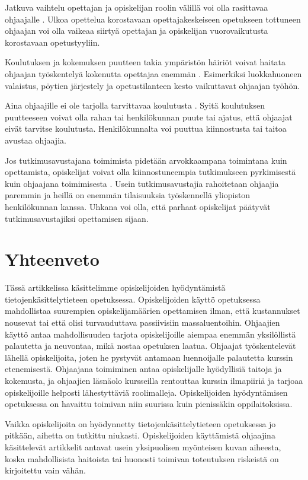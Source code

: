 \documentclass[finnish]{tktltiki2}
\theoremstyle{definition}
\theoremstyle{remark}
\begin{document}
Jatkuva vaihtelu opettajan ja opiskelijan roolin välillä voi olla rasittavaa ohjaajalle \cite{Mark11}. Ulkoa opettelua korostavaan opettajakeskeiseen opetukseen tottuneen ohjaajan voi olla vaikeaa siirtyä opettajan ja opiskelijan vuorovaikutusta korostavaan opetustyyliin. \par

Koulutuksen ja kokemuksen puutteen takia ympäristön häiriöt voivat haitata ohjaajan työskentelyä kokenutta opettajaa enemmän \cite{Patitsas12_3}. Esimerkiksi luokkahuoneen valaistus, pöytien järjestely ja opetustilanteen kesto vaikuttavat ohjaajan työhön. \par

Aina ohjaajille ei ole tarjolla tarvittavaa koulutusta \cite{Shannon98}. Syitä koulutuksen puutteeseen voivat olla rahan tai henkilökunnan puute tai ajatus, että ohjaajat eivät tarvitse koulutusta. Henkilökunnalta voi puuttua kiinnostusta tai taitoa avustaa ohjaajia. \par

Jos tutkimusavustajana toimimista pidetään arvokkaampana toimintana kuin opettamista, opiskelijat voivat olla kiinnostuneempia tutkimukseen pyrkimisestä kuin ohjaajana toimimisesta \cite{Shannon98}. Usein tutkimusavustajia rahoitetaan ohjaajia paremmin ja heillä on enemmän tilaisuuksia työskennellä yliopiston henkilökunnan kanssa. Uhkana voi olla, että parhaat opiskelijat päätyvät tutkimusavustajiksi opettamisen sijaan. \par


\section{Yhteenveto}
Tässä artikkelissa käsittelimme opiskelijoiden hyödyntämistä tie\-to\-jen\-kä\-sit\-te\-ly\-tie\-teen opetuksessa. Opiskelijoiden käyttö opetuksessa mahdollistaa suurempien opiskelijamäärien opettamisen ilman, että kustannukset nousevat tai että olisi turvauduttava passiivisiin massaluentoihin. Ohjaajien käyttö antaa mahdollisuuden tarjota opiskelijoille aiempaa enemmän yksilöllistä palautetta ja neuvontaa, mikä nostaa opetuksen laatua. Ohjaajat työskentelevät lähellä opiskelijoita, joten he pystyvät antamaan luennoijalle palautetta kurssin etenemisestä. Ohjaajana toimiminen antaa opiskelijalle hyödyllisiä taitoja ja kokemusta, ja ohjaajien läsnäolo kursseilla rentouttaa kurssin ilmapiiriä ja tarjoaa opiskelijoille helposti lähestyttäviä roolimalleja. Opiskelijoiden hyödyntämisen opetuksessa on havaittu toimivan niin suurissa \cite{Reges03} kuin pienissäkin \cite{Dickson11} oppilaitoksissa. \par

Vaikka opiskelijoita on hyödynnetty tietojenkäsittelytieteen opetuksessa jo pitkään, aihetta on tutkittu niukasti. Opiskelijoiden käyttämistä ohjaajina käsittelevät artikkelit antavat usein yksipuolisen myönteisen kuvan aiheesta, koska mahdollisista haitoista tai huonosti toimivan toteutuksen riskeistä on kirjoitettu vain vähän.  \par



\end{document}
